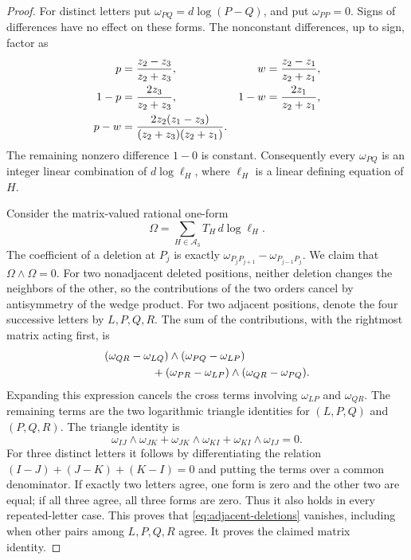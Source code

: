 \documentclass[11pt]{article}
\theoremstyle{definition}
\theoremstyle{remark}
\numberwithin{equation}{section}
\begin{document}
\begin{proof}
For distinct letters put $\omega_{PQ}=d\log(P-Q)$, and put
$\omega_{PP}=0$.  Signs of differences have no effect on these forms.
The nonconstant differences, up to sign, factor as
\begin{align}
 p&=\frac{z_2-z_3}{z_2+z_3},&
 w&=\frac{z_2-z_1}{z_2+z_1},\notag\\
 1-p&=\frac{2z_3}{z_2+z_3},&
 1-w&=\frac{2z_1}{z_2+z_1},\label{eq:deletion-factorization}\\
 p-w&=\frac{2z_2(z_1-z_3)}{(z_2+z_3)(z_2+z_1)}.&&\notag
\end{align}
The remaining nonzero difference $1-0$ is constant.  Consequently every
$\omega_{PQ}$ is an integer linear combination of $d\log\ell_H$, where
$\ell_H$ is a linear defining equation of $H$.

Consider the matrix-valued rational one-form
\[
 \Omega=\sum_{H\in\mathcal A_3}T_H\,d\log\ell_H.
\]
The coefficient of a deletion at $P_j$ is exactly
$\omega_{P_jP_{j+1}}-\omega_{P_{j-1}P_j}$.  We claim that
$\Omega\wedge\Omega=0$.  For two nonadjacent deleted positions, neither
deletion changes the neighbors of the other, so the contributions of
the two orders cancel by antisymmetry of the wedge product.  For two
adjacent positions, denote the four successive letters by $L,P,Q,R$.
The sum of the contributions, with the rightmost matrix acting first,
is
\begin{align}
 &(\omega_{QR}-\omega_{LQ})\wedge
       (\omega_{PQ}-\omega_{LP})\notag\\
 &\hspace{15mm}+
 (\omega_{PR}-\omega_{LP})\wedge
       (\omega_{QR}-\omega_{PQ}).\label{eq:adjacent-deletions}
\end{align}
Expanding this expression cancels the cross terms involving
$\omega_{LP}$ and $\omega_{QR}$.  The remaining terms are the two
logarithmic triangle identities for $(L,P,Q)$ and $(P,Q,R)$.  The
triangle identity is
\[
 \omega_{IJ}\wedge\omega_{JK}
 +\omega_{JK}\wedge\omega_{KI}
 +\omega_{KI}\wedge\omega_{IJ}=0.
\]
For three distinct letters it follows by differentiating the relation
$(I-J)+(J-K)+(K-I)=0$ and putting the terms over a common denominator.
If exactly two letters agree, one form is zero and the other two are
equal; if all three agree, all three forms are zero.  Thus it also holds
in every repeated-letter case.  This proves that
\eqref{eq:adjacent-deletions} vanishes, including when other pairs among
$L,P,Q,R$ agree.  It proves the claimed matrix identity.


\end{proof}
\end{document}

